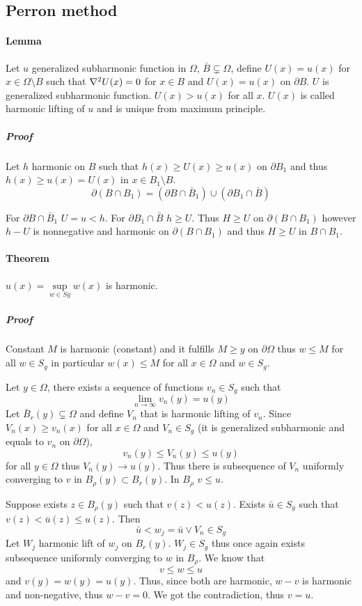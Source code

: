 \subsection{Perron method}
\paragraph{Lemma} Let $u$ generalized subharmonic function in $\Omega$, $\bar{B} \subsetneq \Omega$, define 
$U(x) = 
u(x) $ for $x\in \Omega \setminus B$ such that $\laplacian{U(x)}=0$ for $x\in B$ and $U(x)=u(x)$ on $\partial B$. $U$ is generalized subharmonic function. $U(x) > u(x)$ for all $x$. $U(x)$ is called harmonic lifting of $u$ and is unique from maximum principle.

\subparagraph{Proof}
Let $h$ harmonic on $B$ such that $h(x) \geq U(x) \geq u(x)$ on $\partial B_1$ and thus $h(x) \geq u(x) = U(x)$ in $x \in B_1 \setminus B$.
$$\partial (B\cap B_1) = (\partial B \cap \bar{B}_1)\cup(\partial B_1 \cap \bar{B})$$

For  $\partial B \cap \bar{B}_1$ $U=u< h$.
For $\partial B_1 \cap \bar{B}$ $h\geq U$. 
Thus $H \geq U$ on $\partial (B\cap B_1)$ however $h-U$ is nonnegative and harmonic on $\partial (B\cap B_1)$  and thus $H \geq U$ in $B\cap B_1$.
\paragraph{Theorem}
$u(x) = \sup\limits_{w\in S g} w(x)$ is harmonic.
\subparagraph{Proof} Constant $M$ is harmonic (constant) and it fulfills $M\geq y$ on $\partial \Omega$ thus $w\leq M$ for all $w\in S_g$ in particular $w(x) \leq M$ for all $x\in \Omega$ and $w\in S_g$. 

Let $y\in \Omega$, there exists a sequence of functions $v_n \in S_g$ such that
$$\lim_{n \to \infty} v_n(y) = u(y)$$
Let $\bar{B}_r(y) \subsetneq \Omega$ and define $V_n$  that is harmonic lifting of $v_n$. Since $V_n(x) \geq v_n(x)$ for all $x\in \Omega$ and $V_n \in S_g$ (it is generalized subharmonic and equals to $v_n$ on $\partial \Omega$), 
$$v_n(y) \leq V_n(y) \leq u(y)$$
for all $y\in \Omega$ thus $V_n(y) \to u(y)$. Thus there is subsequence of $V_n$ uniformly converging to $v$ in $B_\rho(y) \subset B_r(y)$. In $B_\rho$ $v\leq u$.

Suppose exists $z \in B_\rho(y)$ such that $v(z) < u(z)$. Exists $\bar{u} \in S_g$ such that $v(z) < \bar{u}(z) \leq u(z)$. Then
$$\bar{u} < w_j = \bar{u} \lor V_n \in S_g$$
Let $W_j$ harmonic lift of $w_j$ on $B_r(y)$. $W_j\in S_g$ thus once again exists subsequence uniformly converging to $w$ in $B_\rho$. We know that
$$v\leq w \leq u$$ 
and $v(y)=w(y)=u(y)$. Thus, since both are harmonic, $w-v$ is harmonic and non-negative, thus $w-v=0$. We got the contradiction, thus $v=u$.
